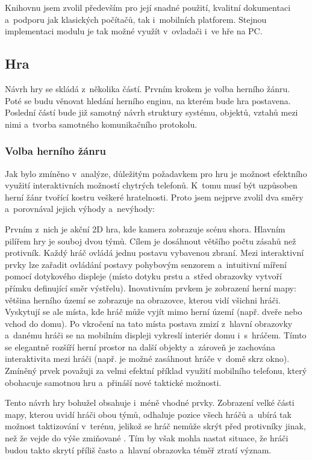 \documentclass[thesis=B,czech,hidelinks]{FITthesis}[2012/06/26] %
\begin{document}
Knihovnu jsem zvolil především pro její snadné použití, kvalitní dokumentaci a~podporu jak klasických počítačů, tak i~mobilních platforem. Stejnou implementaci modulu je tak možné využít v~ovladači i~ve hře na PC.

\subsection{Hra}

Návrh hry se skládá z~několika částí. Prvním krokem je volba herního žánru. Poté se budu věnovat hledání herního enginu, na kterém bude hra postavena. Poslední částí bude již samotný návrh struktury systému, objektů, vztahů mezi nimi a~tvorba samotného komunikačního protokolu.

\subsubsection{Volba herního žánru}

Jak bylo zmíněno v~analýze, důležitým požadavkem pro hru je možnost efektního využití interaktivních možností chytrých telefonů. K~tomu musí být uzpůsoben herní žánr tvořící kostru veškeré hratelnosti. Proto jsem nejprve zvolil dva směry a~porovnával jejich výhody a~nevýhody:

Prvním z~nich je akční 2D hra, kde kamera zobrazuje scénu shora. Hlavním pilířem hry je souboj dvou týmů. Cílem je dosáhnout většího počtu zásahů než protivník. Každý hráč ovládá jednu postavu vybavenou zbraní. Mezi interaktivní prvky lze zařadit ovládání postavy pohybovým senzorem a~intuitivní míření pomocí dotykového displeje (místo dotyku prstu a~střed obrazovky vytvoří přímku definující směr výstřelu). Inovativním prvkem je zobrazení herní mapy: většina herního území se zobrazuje na obrazovce, kterou vidí všichni hráči. Vyskytují se ale místa, kde hráč může vyjít mimo herní území (např. dveře nebo vchod do domu). Po vkročení na tato místa postava zmizí z~hlavní obrazovky a~danému hráči se na mobilním displeji vykreslí interiér domu i~s~hráčem. Tímto se elegantně rozšíří herní prostor na další objekty a~zároveň je zachována interaktivita mezi hráči (např. je možné zasáhnout hráče v~domě skrz okno). Zmíněný prvek považuji za velmi efektní příklad využití mobilního telefonu, který obohacuje samotnou hru a~přináší nové taktické možnosti.

Tento návrh hry bohužel obsahuje i~méně vhodné prvky. Zobrazení velké části mapy, kterou uvidí hráči obou týmů, odhaluje pozice všech hráčů a~ubírá tak možnost taktizování v~terénu, jelikož se hráč nemůže skrýt před protivníky jinak, než že vejde do výše zmiňované . Tím by však mohla nastat situace, že hráči budou takto skrytí příliš často a~hlavní obrazovka téměř ztratí význam.
\end{document}
